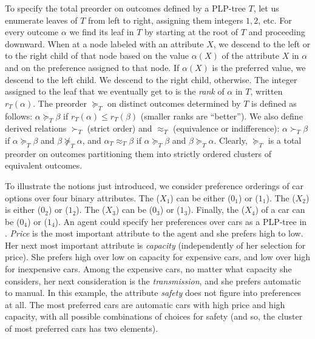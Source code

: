 To specify the total preorder on outcomes defined by a PLP-tree $T$, let 
us enumerate leaves of $T$ from left to right, assigning them 
integers $1,2$, etc. For every outcome $\alpha$ we find its leaf 
in $T$ by starting at the root of $T$ and proceeding downward. 
When at a node labeled with an attribute $X$, we descend to the left or to the 
right child of that node based on the value $\alpha(X)$ of the attribute $X$ 
in $\alpha$ and on the preference assigned to that node. If $\alpha(X)$ is 
the preferred value, we descend to the left child. We descend to the right
child,
otherwise. The integer assigned to the leaf that we eventually get 
to is the \emph{rank} 
of $\alpha$ in $T$, written $r_T(\alpha)$. The preorder $\succeq_T$ on 
distinct outcomes determined by $T$ is defined as follows: $\alpha\succeq_T \beta$ 
if $r_T(\alpha)\leq r_T(\beta)$ (smaller ranks are ``better''). We also 
define derived relations $\succ_T$ (strict order) and $\approx_T$ 
(equivalence or indifference): $\alpha \succ_T\beta$ if $\alpha\succeq_T
\beta$ and $\beta \not\succeq_T \alpha$, and $\alpha_T\approx_T\beta$ if 
$\alpha\succeq_T\beta$ and $\beta\succeq_T \alpha$. Clearly, $\succeq_T$ 
is a total preorder on outcomes partitioning them into strictly ordered 
clusters of equivalent outcomes. 

To illustrate the notions just introduced, we consider preference orderings 
of car options over four binary attributes. The  ($X_1$) can 
be either  ($0_1$) or  ($1_1$). The  
($X_2$) is either  ($0_2$) or  ($1_2$).
The  ($X_3$) can be  ($0_3$) or  
($1_3$). Finally, the  ($X_4$) of a car 
can be  ($0_4$) or  ($1_4$).
An agent could specify her preferences over cars as a PLP-tree in 
. \emph{Price} is the most important attribute to 
the agent and she prefers high to low. Her next most important attribute is 
\emph{capacity} (independently of her selection for price). She 
prefers high over low on capacity for expensive cars, 
and low over high for inexpensive cars.
Among the expensive cars, no matter what capacity she considers, her next 
consideration is the \emph{transmission}, and she prefers automatic to manual.
In this example, the attribute \emph{safety} does not figure into preferences at all.
The most preferred cars are automatic cars with high price and high capacity,
with all possible combinations of choices for safety (and so, 
the cluster of most preferred cars has two elements).

